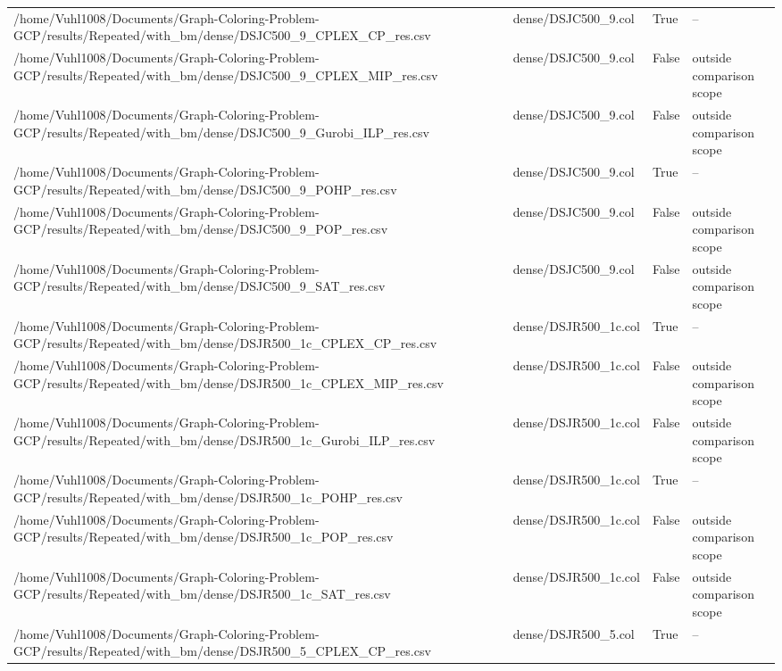 \begin{table}[htbp]
\begin{tabular}{llll}
/home/Vuhl1008/Documents/Graph-Coloring-Problem-GCP/results/Repeated/with\_bm/dense/DSJC500\_9\_CPLEX\_CP\_res.csv & dense/DSJC500\_9.col & True & -- \\
/home/Vuhl1008/Documents/Graph-Coloring-Problem-GCP/results/Repeated/with\_bm/dense/DSJC500\_9\_CPLEX\_MIP\_res.csv & dense/DSJC500\_9.col & False & outside comparison scope \\
/home/Vuhl1008/Documents/Graph-Coloring-Problem-GCP/results/Repeated/with\_bm/dense/DSJC500\_9\_Gurobi\_ILP\_res.csv & dense/DSJC500\_9.col & False & outside comparison scope \\
/home/Vuhl1008/Documents/Graph-Coloring-Problem-GCP/results/Repeated/with\_bm/dense/DSJC500\_9\_POHP\_res.csv & dense/DSJC500\_9.col & True & -- \\
/home/Vuhl1008/Documents/Graph-Coloring-Problem-GCP/results/Repeated/with\_bm/dense/DSJC500\_9\_POP\_res.csv & dense/DSJC500\_9.col & False & outside comparison scope \\
/home/Vuhl1008/Documents/Graph-Coloring-Problem-GCP/results/Repeated/with\_bm/dense/DSJC500\_9\_SAT\_res.csv & dense/DSJC500\_9.col & False & outside comparison scope \\
/home/Vuhl1008/Documents/Graph-Coloring-Problem-GCP/results/Repeated/with\_bm/dense/DSJR500\_1c\_CPLEX\_CP\_res.csv & dense/DSJR500\_1c.col & True & -- \\
/home/Vuhl1008/Documents/Graph-Coloring-Problem-GCP/results/Repeated/with\_bm/dense/DSJR500\_1c\_CPLEX\_MIP\_res.csv & dense/DSJR500\_1c.col & False & outside comparison scope \\
/home/Vuhl1008/Documents/Graph-Coloring-Problem-GCP/results/Repeated/with\_bm/dense/DSJR500\_1c\_Gurobi\_ILP\_res.csv & dense/DSJR500\_1c.col & False & outside comparison scope \\
/home/Vuhl1008/Documents/Graph-Coloring-Problem-GCP/results/Repeated/with\_bm/dense/DSJR500\_1c\_POHP\_res.csv & dense/DSJR500\_1c.col & True & -- \\
/home/Vuhl1008/Documents/Graph-Coloring-Problem-GCP/results/Repeated/with\_bm/dense/DSJR500\_1c\_POP\_res.csv & dense/DSJR500\_1c.col & False & outside comparison scope \\
/home/Vuhl1008/Documents/Graph-Coloring-Problem-GCP/results/Repeated/with\_bm/dense/DSJR500\_1c\_SAT\_res.csv & dense/DSJR500\_1c.col & False & outside comparison scope \\
/home/Vuhl1008/Documents/Graph-Coloring-Problem-GCP/results/Repeated/with\_bm/dense/DSJR500\_5\_CPLEX\_CP\_res.csv & dense/DSJR500\_5.col & True & -- \\

\end{tabular}
\end{table}
